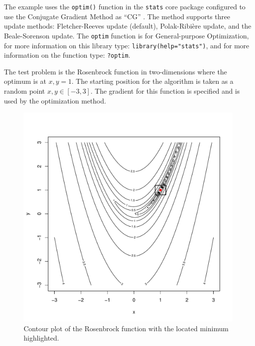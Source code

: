 The example uses the \texttt{optim()} function in the \texttt{stats} core package configured to use the Conjugate Gradient Method as ``CG'' \cite{RDevelopmentCoreTeam2011a}. The method supports three update methods: Fletcher-Reeves update (default), Polak-Ribi\`ere update, and the Beale-Sorenson update. The \texttt{optim} function is for General-purpose Optimization, for more information on this library type: \texttt{library(help="stats")}, and for more information on the function type: \texttt{?optim}.

The test problem is the Rosenbrock function in two-dimensions where the optimum is at $x,y=1$. The starting position for the algorithm is taken as a random point $x,y \in [-3,3]$. The gradient for this function is specified and is used by the optimization method.



\begin{figure}[htp]
\centering
\includegraphics[scale=0.45]{a_optimization/conjugate_gradient_result.pdf}
\caption{Contour plot of the Rosenbrock function with the located minimum highlighted.}
\label{plot:conjugate_gradient_result}
\end{figure}

